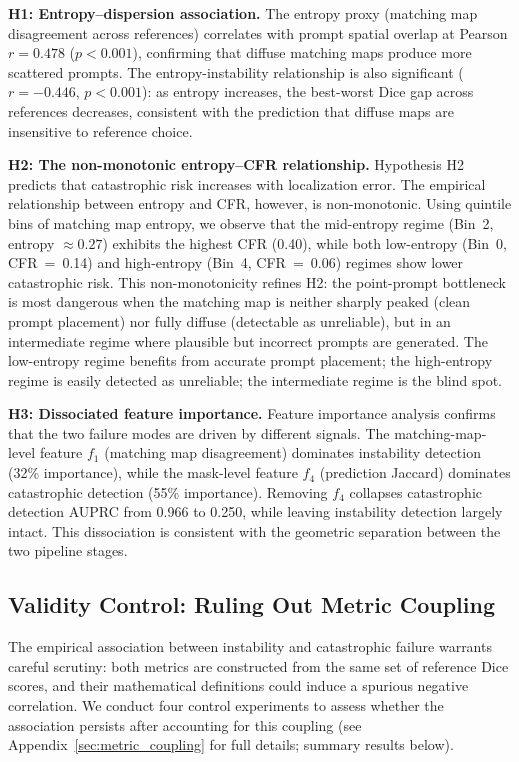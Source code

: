 \documentclass[10pt,twocolumn,letterpaper]{article}
\begin{document}
\medskip\noindent
\textbf{H1: Entropy--dispersion association.} The entropy proxy (matching
map disagreement across references) correlates with prompt spatial overlap
at Pearson $r = 0.478$ ($p < 0.001$), confirming that diffuse matching maps
produce more scattered prompts. The entropy-instability relationship is also
significant ($r = -0.446$, $p < 0.001$): as entropy increases, the
best-worst Dice gap across references decreases, consistent with the
prediction that diffuse maps are insensitive to reference choice.

\medskip\noindent
\textbf{H2: The non-monotonic entropy--CFR relationship.} Hypothesis H2
predicts that catastrophic risk increases with localization error. The
empirical relationship between entropy and CFR, however, is non-monotonic.
Using quintile bins of matching map entropy, we observe that the
mid-entropy regime (Bin~2, entropy $\approx 0.27$) exhibits the highest CFR
(0.40), while both low-entropy (Bin~0, CFR~=~0.14) and high-entropy
(Bin~4, CFR~=~0.06) regimes show lower catastrophic risk. This
non-monotonicity refines H2: the point-prompt bottleneck is most dangerous
when the matching map is neither sharply peaked (clean prompt placement) nor
fully diffuse (detectable as unreliable), but in an intermediate regime
where plausible but incorrect prompts are generated. The low-entropy regime
benefits from accurate prompt placement; the high-entropy regime is easily
detected as unreliable; the intermediate regime is the blind spot.

\medskip\noindent
\textbf{H3: Dissociated feature importance.} Feature importance analysis
confirms that the two failure modes are driven by different signals. The
matching-map-level feature $f_1$ (matching map disagreement) dominates
instability detection (32\% importance), while the mask-level feature $f_4$
(prediction Jaccard) dominates catastrophic detection (55\% importance).
Removing $f_4$ collapses catastrophic detection AUPRC from 0.966 to 0.250,
while leaving instability detection largely intact. This dissociation is
consistent with the geometric separation between the two pipeline stages.

\subsection{Validity Control: Ruling Out Metric Coupling}

The empirical association between instability and catastrophic failure
warrants careful scrutiny: both metrics are constructed from the same set of
reference Dice scores, and their mathematical definitions could induce a
spurious negative correlation. We conduct four control experiments to assess
whether the association persists after accounting for this coupling (see
Appendix~\ref{sec:metric_coupling} for full details; summary results below).
\end{document}
